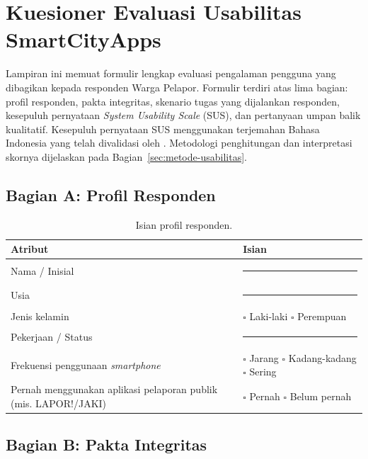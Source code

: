 \chapter{Kuesioner Evaluasi Usabilitas SmartCityApps}
\label{app:kuesioner-sus}

Lampiran ini memuat formulir lengkap evaluasi pengalaman pengguna yang dibagikan kepada responden Warga Pelapor. Formulir terdiri atas lima bagian: profil responden, pakta integritas, skenario tugas yang dijalankan responden, kesepuluh pernyataan \textit{System Usability Scale} (SUS), dan pertanyaan umpan balik kualitatif. Kesepuluh pernyataan SUS menggunakan terjemahan Bahasa Indonesia yang telah divalidasi oleh \citet{sharfinaIndonesianAdaptationSystem2016}. Metodologi penghitungan dan interpretasi skornya dijelaskan pada Bagian~\ref{sec:metode-usabilitas}.

\section*{Bagian A: Profil Responden}

\begin{table}[htbp]
\centering
\small
\caption{Isian profil responden.}
\label{tab:form-profil}
\begin{tabular}{p{4.5cm} p{8cm}}
\toprule
\textbf{Atribut} & \textbf{Isian} \\
\midrule
Nama / Inisial & \rule{7.5cm}{0.4pt} \\
\addlinespace
Usia & \rule{7.5cm}{0.4pt} \\
\addlinespace
Jenis kelamin & $\square$ Laki-laki \quad $\square$ Perempuan \\
\addlinespace
Pekerjaan / Status & \rule{7.5cm}{0.4pt} \\
\addlinespace
Frekuensi penggunaan \textit{smartphone} & $\square$ Jarang \quad $\square$ Kadang-kadang \quad $\square$ Sering \\
\addlinespace
Pernah menggunakan aplikasi pelaporan publik (mis. LAPOR!/JAKI) & $\square$ Pernah \quad $\square$ Belum pernah \\
\bottomrule
\end{tabular}
\end{table}

\section*{Bagian B: Pakta Integritas}


